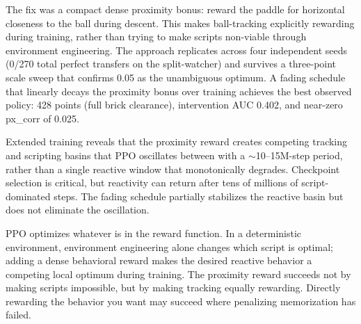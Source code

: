 \documentclass[11pt]{article}
\begin{document}
The fix was a compact dense proximity bonus: reward the paddle for horizontal
closeness to the ball during descent. This makes ball-tracking explicitly
rewarding during training, rather than trying to make scripts non-viable
through environment engineering. The approach replicates across four
independent seeds (0/270 total perfect transfers on the split-watcher) and
survives a three-point scale sweep that confirms 0.05 as the unambiguous
optimum. A fading schedule that linearly decays the proximity bonus over
training achieves the best observed policy: 428 points (full brick clearance),
intervention AUC 0.402, and near-zero px\_corr of 0.025.

Extended training reveals that the proximity reward creates competing
tracking and scripting basins that PPO oscillates between with a
$\sim$10--15M-step period, rather than a single reactive window that
monotonically degrades. Checkpoint selection is critical, but reactivity
can return after tens of millions of script-dominated steps. The fading
schedule partially stabilizes the reactive basin but does not eliminate the
oscillation.

PPO optimizes whatever is in the reward function. In a
deterministic environment, environment engineering alone changes which script is
optimal; adding a dense behavioral reward makes the desired reactive behavior
a competing local optimum during training. The proximity reward succeeds not
by making scripts impossible, but by making tracking equally rewarding.
Directly rewarding the behavior you want may succeed where penalizing
memorization has failed.
\end{document}

